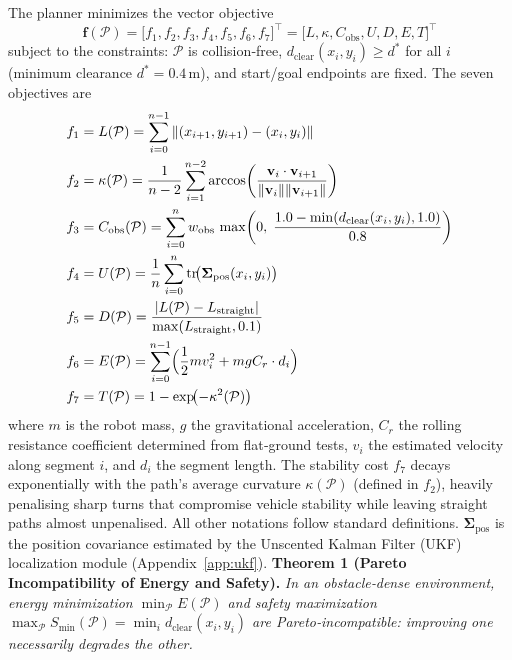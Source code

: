 \documentclass[lettersize,journal]{IEEEtran}
\begin{document}
The planner minimizes the vector objective
\begin{equation}
  \mathbf{f}(\mathcal{P})
  = \bigl[f_1,f_2,f_3,f_4,f_5,f_6,f_7\bigr]^\top
  = \bigl[L,\kappa,C_{\mathrm{obs}},U,D,E,T\bigr]^\top
  \label{eq:objectives}
\end{equation}
subject to the constraints: $\mathcal{P}$ is collision‑free,
$d_{\mathrm{clear}}(x_i,y_i) \ge d^*$ for all $i$ (minimum clearance
$d^* = 0.4$\,m), and start/goal endpoints are fixed. The seven objectives are
\begin{align}
  f_1 &= L(\mathcal{P})
       = \sum_{i=0}^{n-1}\|(x_{i+1},y_{i+1})-(x_i,y_i)\|
       \label{eq:f1} \\
  f_2 &= \kappa(\mathcal{P})
       = \frac{1}{n-2}\sum_{i=1}^{n-2}
         \arccos\!\left(\frac{\mathbf{v}_i\cdot\mathbf{v}_{i+1}}
         {\|\mathbf{v}_i\|\|\mathbf{v}_{i+1}\|}\right)
       \label{eq:f2} \\
  f_3 &= C_{\mathrm{obs}}(\mathcal{P})
       = \sum_{i=0}^{n} w_{\mathrm{obs}}\,
         \max\!\left(0,\;
         \frac{1.0-\min(d_{\mathrm{clear}}(x_i,y_i),1.0)}{0.8}
         \right)
        \label{eq:f3} \\
  f_4 &= U(\mathcal{P})
       = \frac{1}{n}\sum_{i=0}^{n}\mathrm{tr}\!\bigl(\boldsymbol{\Sigma}_{\mathrm{pos}}(x_i,y_i)\bigr)
       \label{eq:f4} \\
  f_5 &= D(\mathcal{P})
       = \frac{|L(\mathcal{P})-L_{\mathrm{straight}}|}
              {\max(L_{\mathrm{straight}},0.1)}
       \label{eq:f5} \\
  f_6 &= E(\mathcal{P})
       = \sum_{i=0}^{n-1} \Bigl(\frac12 m v_i^2 + m g C_r \cdot d_i\Bigr)
       \label{eq:f6} \\
  f_7 &= T(\mathcal{P})
       = 1 - \exp\!\bigl(-\kappa^2(\mathcal{P})\bigr)
       \label{eq:f7} 
\end{align}
where $m$ is the robot mass, $g$ the gravitational acceleration, $C_r$ the
rolling resistance coefficient determined from flat‑ground tests, $v_i$ the
estimated velocity along segment $i$, and $d_i$ the segment length. The
stability cost $f_7$ decays exponentially with the path’s average curvature
$\kappa(\mathcal{P})$ (defined in $f_2$), heavily penalising sharp turns that
compromise vehicle stability while leaving straight paths almost unpenalised.
All other notations follow standard definitions.
$\boldsymbol{\Sigma}_{\mathrm{pos}}$ is the position covariance estimated by
the Unscented Kalman Filter (UKF) localization module (Appendix~\ref{app:ukf}).
\textbf{Theorem 1 (Pareto Incompatibility of Energy and Safety).}
\label{thm:pareto}
\textit{In an obstacle‑dense environment, energy minimization
$\min_\mathcal{P} E(\mathcal{P})$ and safety maximization
$\max_\mathcal{P} S_{\min}(\mathcal{P}) = \min_i d_{\mathrm{clear}}(x_i,y_i)$
are Pareto‑incompatible: improving one necessarily degrades the other.}
\end{document}
